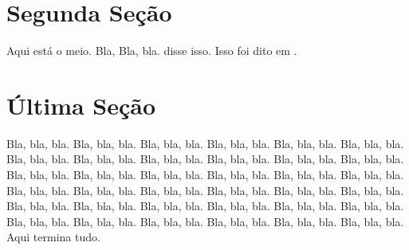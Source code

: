 \documentclass{amsart}
\begin{document}
\section{Segunda Seção}
\label{s_sec2}

Aqui está o meio. Bla, Bla, bla.  \citet{Pla99a} disse isso.
Isso foi dito em \citet{Pla99a}.


\begin{comment}
\begin{table}[ht]
\centering
\caption{Um exemplo de tabela}
\label{t_simulation}
\begin{tabular}{|c|c|}
\hline
Locker Name & $\%$ Accuracy \\ \hline
\hline
Boson                  & 98.9        \\
Seth                   & 92.6        \\
Berlin                 & 96.1        \\
Grape                & 99.3 	\\
\hline
\end{tabular}
\end{table}
\end{comment}

\section{Última Seção}
\label{s_conclusion}

Bla, bla, bla.
Bla, bla, bla.
Bla, bla, bla.
Bla, bla, bla.
Bla, bla, bla.
Bla, bla, bla.
Bla, bla, bla.
Bla, bla, bla.
Bla, bla, bla.
Bla, bla, bla.
Bla, bla, bla.
Bla, bla, bla.
Bla, bla, bla.
Bla, bla, bla.
Bla, bla, bla.
Bla, bla, bla.
Bla, bla, bla.
Bla, bla, bla.
Bla, bla, bla.
Bla, bla, bla.
Bla, bla, bla.
Bla, bla, bla.
Bla, bla, bla.
Bla, bla, bla.
Bla, bla, bla.
Bla, bla, bla.
Bla, bla, bla.
Bla, bla, bla.
Bla, bla, bla.
Bla, bla, bla.
Bla, bla, bla.
Bla, bla, bla.
Bla, bla, bla.
Bla, bla, bla.
Bla, bla, bla.
Bla, bla, bla.
Aqui termina tudo.



\end{document}
